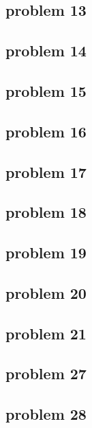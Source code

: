\subsection{problem 13}


\subsection{problem 14}


\subsection{problem 15}


\subsection{problem 16}


\subsection{problem 17}


\subsection{problem 18}


\subsection{problem 19}


\subsection{problem 20}


\subsection{problem 21}


\subsection{problem 27}


\subsection{problem 28}
